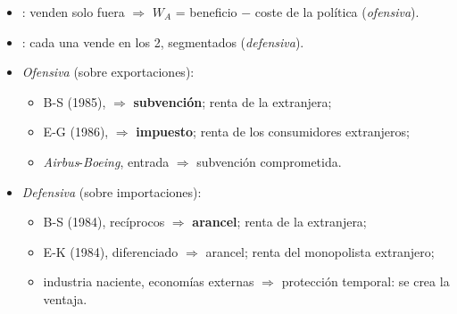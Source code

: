 \documentclass{article}
\begin{document}
\begin{columnas}
\begin{itemize}
\begin{itemize}
  \end{itemize}
\item {}: venden solo fuera $\Rightarrow$ $W_A$ = beneficio $-$ coste de la política (\emph{ofensiva}).
\item {}: cada una vende en los 2, segmentados (\emph{defensiva}).
\end{itemize}
\begin{itemize}
\item \emph{Ofensiva} (sobre exportaciones):
  \begin{itemize}
  \item B-S (1985),  $\Rightarrow$ \textbf{subvención}; renta de la extranjera;
  \item E-G (1986),  $\Rightarrow$ \textbf{impuesto}; renta de los consumidores extranjeros;
  \item \emph{Airbus}-\emph{Boeing}, entrada $\Rightarrow$ subvención comprometida.
  \end{itemize}
\item \emph{Defensiva} (sobre importaciones):
  \begin{itemize}
  \item B-S (1984), recíprocos $\Rightarrow$ \textbf{arancel}; renta de la extranjera;
  \item E-K (1984), diferenciado $\Rightarrow$ arancel; renta del monopolista extranjero;
  \item industria naciente, economías externas $\Rightarrow$ protección temporal: se crea la ventaja.
  \end{itemize}
\end{itemize}


\end{columnas}
\end{document}
